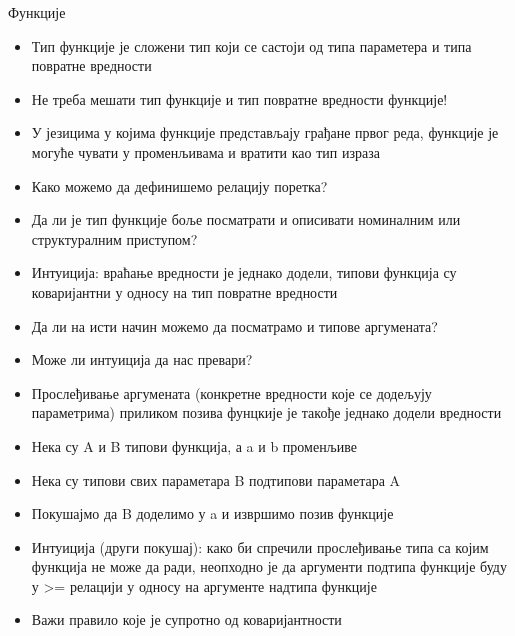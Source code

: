 \documentclass[xcolor=table]{beamer}
\begin{document}
    \begin{frame}[allowframebreaks]{Функције}
        \begin{itemize}
            \item Тип функције је сложени тип који се састоји од типа параметера и типа повратне вредности
            \item Не треба мешати тип функције и тип повратне вредности функције!
            \item У језицима у којима функције представљају грађане првог реда, функције је могуће чувати у променљивама и вратити као тип израза
            \item Како можемо да дефинишемо релацију поретка?
            \item Да ли је тип функције боље посматрати и описивати номиналним или структуралним приступом?
        \end{itemize}

        \framebreak

        \begin{itemize}
            \item Интуиција: враћање вредности је једнако додели, типови функција су коваријантни у односу на тип повратне вредности
            \item Да ли на исти начин можемо да посматрамо и типове аргумената?
            \item Може ли интуиција да нас превари?
        \end{itemize}

        \framebreak

        \begin{itemize}
            \item Прослеђивање аргумената (конкретне вредности које се додељују параметрима) приликом позива фунцкије је такође једнако додели вредности
            \item Нека су A и B типови функција, а a и b променљиве
            \item Нека су типови свих параметара B подтипови параметара A
            \item Покушајмо да B доделимо у a и извршимо позив функције
        \end{itemize}

        \framebreak

        \begin{itemize}
            \item Интуиција (други покушај): како би спречили прослеђивање типа са којим функција не може да ради, неопходно је да аргументи подтипа функције буду у >= релацији у односу на аргументе надтипа функције
            \item Важи правило које је супротно од коваријантности
        \end{itemize}
    \end{frame}
\end{document}
